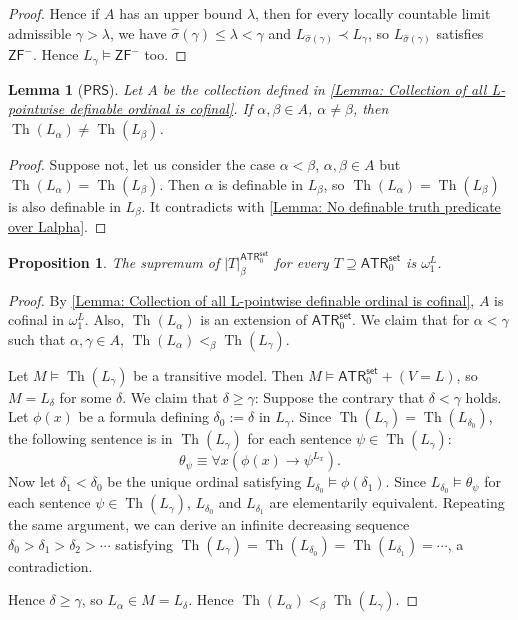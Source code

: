 \documentclass{amsart}
\newtheorem{lemma}[theorem]{Lemma}
\newtheorem{proposition}[proposition]{Proposition}
\theoremstyle{remark}
\newcommand{\PRS}{\mathsf{PRS}}
\newcommand{\ATR}{\mathsf{ATR}}
\newcommand{\set}{\mathsf{set}}
\newcommand{\Th}{\operatorname{Th}}
\begin{document}
\begin{proof}
    Hence if $A$ has an upper bound $\lambda$, then for every locally countable limit admissible $\gamma>\lambda$, we have $\hat{\sigma}(\gamma)\le\lambda < \gamma$ and $L_{\hat{\sigma}(\gamma)}\prec L_\gamma$, so $L_{\hat{\sigma}(\gamma)}$ satisfies $\mathsf{ZF}^-$. Hence $L_\gamma \vDash \mathsf{ZF}^-$ too. 
\end{proof}

\begin{lemma}[$\PRS$] \label{Lemma: L-pointwise definable ordinals give different theories}
    Let $A$ be the collection defined in \autoref{Lemma: Collection of all L-pointwise definable ordinal is cofinal}. If $\alpha,\beta\in A$, $\alpha\neq\beta$, then $\Th(L_\alpha) \neq \Th(L_\beta)$.
\end{lemma}
\begin{proof}
    Suppose not, let us consider the case $\alpha<\beta$, $\alpha,\beta\in A$ but $\Th(L_\alpha) = \Th(L_\beta)$.
    Then $\alpha$ is definable in $L_\beta$, so $\Th(L_\alpha) = \Th(L_\beta)$ is also definable in $L_\beta$. It contradicts with \autoref{Lemma: No definable truth predicate over Lalpha}.
\end{proof}

\begin{proposition} \label{Proposition: Beta rank of theories extending ATR0 set}
    The supremum of $|T|^{\ATR_0^\set}_\beta$ for every $T\supseteq \ATR_0^\set$ is $\omega_1^L$.
\end{proposition}
\begin{proof}
    By \autoref{Lemma: Collection of all L-pointwise definable ordinal is cofinal}, $A$ is cofinal in $\omega_1^L$. Also, $\Th(L_\alpha)$ is an extension of $\ATR_0^\set$.    
    We claim that for $\alpha<\gamma$ such that $\alpha,\gamma\in A$, $\Th(L_\alpha) <_{\beta} \Th(L_\gamma)$.

    Let $M\vDash \Th(L_\gamma)$ be a transitive model. Then $M\vDash \ATR_0^\set + (V=L)$, so $M=L_\delta$ for some $\delta$. We claim that $\delta \ge \gamma$: Suppose the contrary that $\delta<\gamma$ holds. Let $\phi(x)$ be a formula defining $\delta_0 :=\delta$ in $L_\gamma$. Since $\Th(L_\gamma)=\Th(L_{\delta_0})$, the following sentence is in $\Th(L_\gamma)$ for each sentence $\psi\in \Th(L_\gamma)$:
    \begin{equation*}
        \theta_\psi \equiv \forall x (\phi(x) \to \psi^{L_x}).
    \end{equation*}
    Now let $\delta_1 < \delta_0$ be the unique ordinal satisfying $L_{\delta_0}\vDash \phi(\delta_1)$. Since $L_{\delta_0}\vDash \theta_\psi$ for each sentence $\psi\in \Th(L_\gamma)$, $L_{\delta_0}$ and $L_{\delta_1}$ are elementarily equivalent.
    Repeating the same argument, we can derive an infinite decreasing sequence $\delta_0 > \delta_1 > \delta_2 > \cdots$ satisfying $\Th(L_\gamma)=\Th(L_{\delta_0})=\Th(L_{\delta_1})=\cdots$, a contradiction.

    Hence $\delta\ge \gamma$, so $L_\alpha \in M=L_\delta$. Hence $\Th(L_\alpha) <_{\beta} \Th(L_\gamma)$.
\end{proof}
\end{document}
